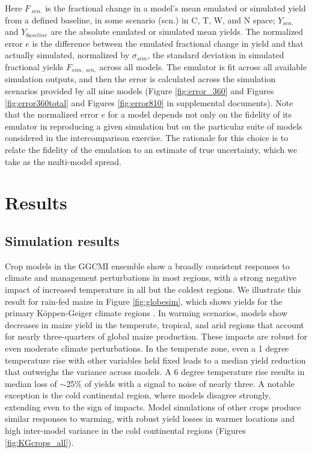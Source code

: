 \documentclass[preprint, 5p, times, twocolumn]{elsarticle}
\begin{document}
Here $F_{\: scn.}$ is the fractional change in a model's mean emulated or simulated yield from a defined baseline, in some scenario (scn.) in C, T, W, and N space; $Y_{scn.}$ and $Y_{baseline}$ are the absolute emulated or simulated mean yields. The normalized error $e$ is the difference between the emulated fractional change in yield and that actually simulated, normalized by $\sigma_{sim}$, the standard deviation in simulated fractional yields $F_{sim,\: scn.}$ across all models. The emulator is fit across all available simulation outputs, and then the error is calculated across the simulation scenarios provided by all nine models (Figure \ref{fig:error_360} and Figures \ref{fig:error360total} and Figures \ref{fig:error810} in supplemental documents). Note that the normalized error $e$ for a model depends not only on the fidelity of its emulator in reproducing a given simulation but on the particular suite of models considered in the intercomparison exercise. The rationale for this choice is to relate the fidelity of the emulation to an estimate of true uncertainty, which we take as the multi-model spread. 

\section{Results}
\label{S:3}
\subsection{Simulation results}
Crop models in the GGCMI ensemble show a broadly consistent responses to climate and management perturbations in most regions, with a strong negative impact of increased temperature in all but the coldest regions. We illustrate this result for rain-fed maize in Figure \ref{fig:globesim}, which shows yields for the primary K\"{o}ppen-Geiger climate regions \citep{rubel2010}. In warming scenarios, models show decreases in maize yield in the temperate, tropical, and arid regions that account for nearly three-quarters of global maize production. These impacts are robust for even moderate climate perturbations. In the temperate zone, even a 1 degree temperature rise with other variables held fixed leads to a median yield reduction that outweighs the variance across models. A 6 degree temperature rise results in median loss of $\sim$25\% of yields with a signal to noise of nearly three. A notable exception is the cold continental region, where models disagree strongly, extending even to the sign of impacts. Model simulations of other crops produce similar responses to warming, with robust yield losses in warmer locations and high inter-model variance in the cold continental regions (Figures \ref{fig:KGcrops_all}).
\end{document}

